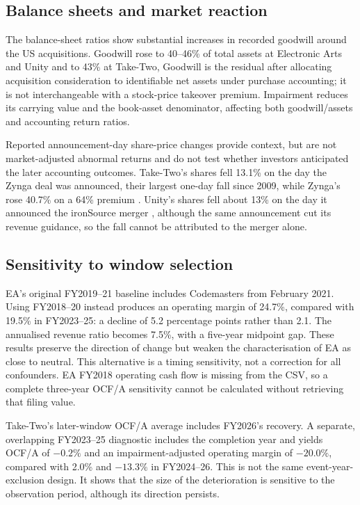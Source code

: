 \documentclass[11pt]{article}
\begin{document}
\subsection{Balance sheets and market reaction}

The balance-sheet ratios show substantial increases in recorded goodwill around the US acquisitions. Goodwill rose to 40--46\% of total assets at Electronic Arts and Unity and to 43\% at Take-Two, Goodwill is the residual after allocating acquisition consideration to identifiable net assets under purchase accounting; it is not interchangeable with a stock-price takeover premium. Impairment reduces its carrying value and the book-asset denominator, affecting both goodwill/assets and accounting return ratios.



Reported announcement-day share-price changes provide context, but are not market-adjusted abnormal returns and do not test whether investors anticipated the later accounting outcomes. Take-Two's shares fell 13.1\% on the day the Zynga deal was announced, their largest one-day fall since 2009, while Zynga's rose 40.7\% on a 64\% premium \citep{vgc2022}. Unity's shares fell about 13\% on the day it announced the ironSource merger \citep{cnbc2022unity}, although the same announcement cut its revenue guidance, so the fall cannot be attributed to the merger alone.

\subsection{Sensitivity to window selection}

EA's original FY2019--21 baseline includes Codemasters from February 2021. Using FY2018--20 instead produces an operating margin of 24.7\%, compared with 19.5\% in FY2023--25: a decline of 5.2 percentage points rather than 2.1. The annualised revenue ratio becomes 7.5\%, with a five-year midpoint gap. These results preserve the direction of change but weaken the characterisation of EA as close to neutral. This alternative is a timing sensitivity, not a correction for all confounders. EA FY2018 operating cash flow is missing from the CSV, so a complete three-year OCF/A sensitivity cannot be calculated without retrieving that filing value.

Take-Two's later-window OCF/A average includes FY2026's recovery. A separate, overlapping FY2023--25 diagnostic includes the completion year and yields OCF/A of $-0.2\%$ and an impairment-adjusted operating margin of $-20.0\%$, compared with 2.0\% and $-13.3\%$ in FY2024--26. This is not the same event-year-exclusion design. It shows that the size of the deterioration is sensitive to the observation period, although its direction persists.
\end{document}
